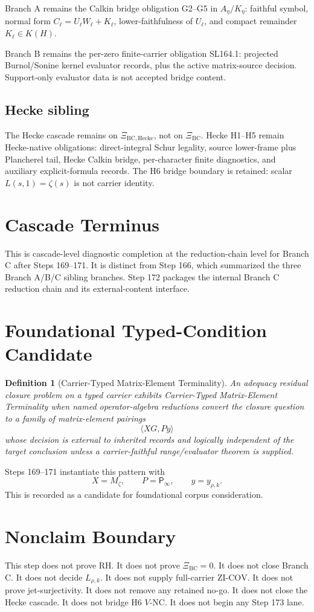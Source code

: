 \documentclass[11pt]{article}
\newtheorem{definition}{Definition}
\newcommand{\XiBC}{\Xi_{\mathrm{BC}}}
\newcommand{\XiHecke}{\Xi_{\mathrm{BC,Hecke}}}
\newcommand{\Psym}{\mathsf P_\infty}
\newcommand{\Mz}{M_\zeta}
\begin{document}
Branch A remains the Calkin bridge obligation G2--G5 in \(A_\eta/K_\eta\):
faithful symbol, normal form \(C_\ell=U_\ell W_\ell+K_\ell\),
lower-faithfulness of \(U_\ell\), and compact remainder \(K_\ell\in K(H)\).

Branch B remains the per-zero finite-carrier obligation SL164.1: projected
Burnol/Sonine kernel evaluator records, plus the active matrix-source
decision.  Support-only evaluator data is not accepted bridge content.

\subsection*{Hecke sibling}

The Hecke cascade remains on \(\XiHecke\), not on \(\XiBC\).  Hecke H1--H5
remain Hecke-native obligations: direct-integral Schur legality, source
lower-frame plus Plancherel tail, Hecke Calkin bridge, per-character finite
diagnostics, and auxiliary explicit-formula records.  The H6 bridge boundary
is retained: scalar \(L(s,1)=\zeta(s)\) is not carrier identity.

\section{Cascade Terminus}

This is cascade-level diagnostic completion at the reduction-chain level for
Branch C after Steps 169--171.  It is distinct from Step 166, which summarized
the three Branch A/B/C sibling branches.  Step 172 packages the internal
Branch C reduction chain and its external-content interface.

\section{Foundational Typed-Condition Candidate}

\begin{definition}[Carrier-Typed Matrix-Element Terminality]
An adequacy residual closure problem on a typed carrier exhibits
Carrier-Typed Matrix-Element Terminality when named operator-algebra reductions
convert the closure question to a family of matrix-element pairings
\[
  \langle XG,Py\rangle
\]
whose decision is external to inherited records and logically independent of
the target conclusion unless a carrier-faithful range/evaluator theorem is
supplied.
\end{definition}

Steps 169--171 instantiate this pattern with
\[
  X=\Mz,\qquad P=\Psym,\qquad y=y_{\rho,k}.
\]
This is recorded as a candidate for foundational corpus consideration.

\section{Nonclaim Boundary}

This step does not prove RH.  It does not prove \(\XiBC=0\).  It does not
close Branch C.  It does not decide \(L_{\rho,k}\).  It does not supply
full-carrier \(\mathrm{ZI\mbox{-}COV}\).  It does not prove
jet-surjectivity.  It does not remove any retained no-go.  It does not close
the Hecke cascade.  It does not bridge H6 \(V\)-NC.  It does not begin any
Step 173 lane.
\end{document}
